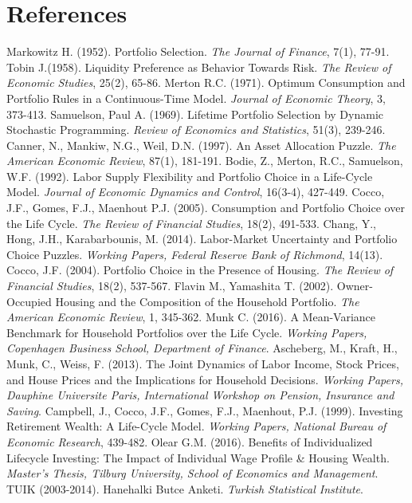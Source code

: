 \documentclass[]{elsarticle}
\begin{document}
\section{References}
\begin{thebibliography}{}
 Markowitz H. (1952). Portfolio Selection. \textit{The Journal of Finance}, 7(1), 77-91.
 Tobin J.(1958). Liquidity Preference as Behavior Towards Risk. \textit{The Review of Economic Studies}, 25(2), 65-86.
 Merton R.C. (1971). Optimum Consumption and Portfolio Rules in a Continuous-Time Model. \textit{Journal of Economic Theory}, 3, 373-413.
 Samuelson, Paul A. (1969). Lifetime Portfolio Selection by Dynamic Stochastic Programming. \textit{Review of Economics and Statistics}, 51(3), 239-246.
 Canner, N., Mankiw, N.G., Weil, D.N. (1997). An Asset Allocation Puzzle. \textit{The American Economic Review}, 87(1), 181-191.
Bodie, Z., Merton, R.C., Samuelson, W.F. (1992). Labor Supply Flexibility and Portfolio Choice in a Life-Cycle Model. \textit{Journal of Economic Dynamics and Control}, 16(3-4), 427-449. 
 Cocco, J.F., Gomes, F.J., Maenhout P.J. (2005). Consumption and Portfolio Choice over the Life Cycle. \textit{The Review of Financial Studies}, 18(2), 491-533. 
 Chang, Y., Hong, J.H., Karabarbounis, M. (2014). Labor-Market Uncertainty and Portfolio Choice Puzzles. \textit{Working Papers, Federal Reserve Bank of Richmond}, 14(13).
 Cocco, J.F. (2004). Portfolio Choice in the Presence of Housing. \textit{The Review of Financial Studies}, 18(2), 537-567.
 Flavin M., Yamashita T. (2002). Owner-Occupied Housing and the Composition of the Household Portfolio. \textit{The American Economic Review}, 1, 345-362.
 Munk C. (2016). A Mean-Variance Benchmark for Household Portfolios over the Life Cycle. \textit{Working Papers, Copenhagen Business School, Department of Finance}.
 Ascheberg, M., Kraft, H., Munk, C., Weiss, F. (2013). The Joint Dynamics of Labor Income, Stock Prices, and House Prices and the Implications for Household Decisions. \textit{Working Papers, Dauphine Universite Paris, International Workshop on Pension, Insurance and Saving}.
 Campbell, J., Cocco, J.F., Gomes, F.J., Maenhout, P.J. (1999). Investing Retirement Wealth: A Life-Cycle Model. \textit{Working Papers, National Bureau of Economic Research}, 439-482.
 Olear G.M. (2016). Benefits of Individualized Lifecycle Investing: The Impact of Individual Wage Profile \& Housing Wealth. \textit{Master's Thesis, Tilburg University, School of Economics and Management}.
 TUIK (2003-2014). Hanehalki Butce Anketi. \textit{Turkish Statistical Institute}.




\end{thebibliography}
\end{document}
